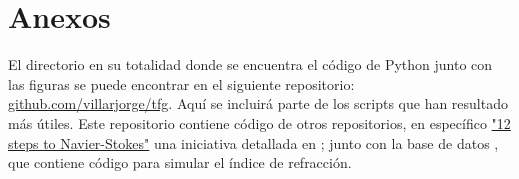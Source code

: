 \section{Anexos}

El directorio en su totalidad donde se encuentra el código de Python junto con las figuras se puede encontrar en el siguiente repositorio: \href{https://github.com/villarjorge/tfg}{github.com/villarjorge/tfg}. Aquí se incluirá parte de los scripts que han resultado más útiles. Este repositorio contiene código de otros repositorios, en específico \href{https://github.com/barbagroup/CFDPython}{"12 steps to Navier-Stokes"} una iniciativa detallada en \cite{barba_cfd_2018}; junto con la base de datos \cite{polyanskiy_refractiveindexinfo_2024}, que contiene código para simular el índice de refracción.

\lstset{style=mystyle}

\begin{otherlanguage}{spanish}
    
\end{otherlanguage}